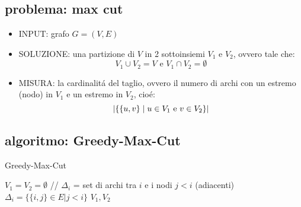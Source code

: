
\subsection*{problema: max cut}
\begin{flushleft}
	\begin{itemize}
		\item INPUT: grafo $G=(V,E)$
		\item SOLUZIONE: una partizione di $V$ in 2 sottoinsiemi $V_1$ e $V_2$, ovvero tale che:
			$$V_1\cup V_2=V\text{ e }V_1\cap V_2=\emptyset$$
		\item MISURA: la cardinalit\'a del taglio, ovvero il numero di archi con un estremo (nodo) in $V_1$ e un estremo in $V_2$, cio\'e:
			$$\vert\{\{u,v\}\hspace{0.1cm}\vert\hspace{0.1cm}u\in V_1\text{ e }v\in V_2\}\vert$$
	\end{itemize}
\end{flushleft}


\subsection*{algoritmo: Greedy-Max-Cut}
\begin{flushleft}
	\begin{algorithm}
		\caption{Greedy-Max-Cut}
		\begin{algorithmic}
			\STATE $V_1=V_2=\emptyset$
				\STATE \color{gray} // $\Delta_i$ = set di archi tra $i$ e i nodi $j<i$ (adiacenti) \color{black}
				\STATE $\Delta_i=\{\{i,j\}\in E\vert j<i\}$
			\ENDFOR
			\RETURN $V_1,V_2$
		\end{algorithmic}
	\end{algorithm}
\end{flushleft}


\subsection*{}
\begin{flushleft}
\end{flushleft}

